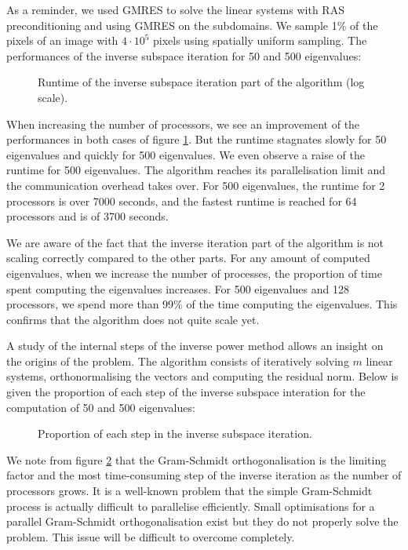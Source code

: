 As a reminder, we used GMRES to solve the linear systems with RAS preconditioning and using GMRES on the subdomains.
We sample 1\% of the pixels of an image with \(4 \cdot 10^5\) pixels using spatially uniform sampling.
The performances of the inverse subspace iteration for 50 and 500 eigenvalues:

\begin{figure}[H]
 \centering
 
 \caption{Runtime of the inverse subspace iteration part of the algorithm (log scale).}
 \label{fig:inv_it_runtime}
\end{figure}

When increasing the number of processors, we see an improvement of the performances in both cases of figure \ref{fig:inv_it_runtime}.
But the runtime stagnates slowly for 50 eigenvalues and quickly for 500 eigenvalues.
We even observe a raise of the runtime for 500 eigenvalues.
The algorithm reaches its parallelisation limit and the communication overhead takes over.
For 500 eigenvalues, the runtime for 2 processors is over 7000 seconds, and the fastest runtime is reached for 64 processors and is of 3700 seconds.

\ifthesis
 We are aware of the fact that the inverse iteration part of the algorithm is not scaling correctly compared to the other parts.
 For any amount of computed eigenvalues, when we increase the number of processes, the proportion of time spent computing the eigenvalues increases.
 For 500 eigenvalues and 128 processors, we spend more than 99\% of the time computing the eigenvalues.
 This confirms that the algorithm does not quite scale yet.
\fi

A study of the internal steps of the inverse power method allows an insight on the origins of the problem.
The algorithm consists of iteratively solving \(m\) linear systems, orthonormalising the vectors and computing the residual norm.
Below is given the proportion of each step of the inverse subspace interation for the computation of 50 and 500 eigenvalues:

\begin{figure}[H]
 \centering
 
 \caption{Proportion of each step in the inverse subspace iteration.}
 \label{fig:inv_it_proportion}
\end{figure}

We note from figure \ref{fig:inv_it_proportion} that the Gram-Schmidt orthogonalisation is the limiting factor and the most time-consuming step of the inverse iteration as the number of processors grows.
It is a well-known problem that the simple Gram-Schmidt process is actually difficult to parallelise efficiently.
Small optimisations for a parallel Gram-Schmidt orthogonalisation exist \cite{katagiri_parallel_gram_schmidt_2003} but they do not properly solve the problem.
This issue will be difficult to overcome completely.
